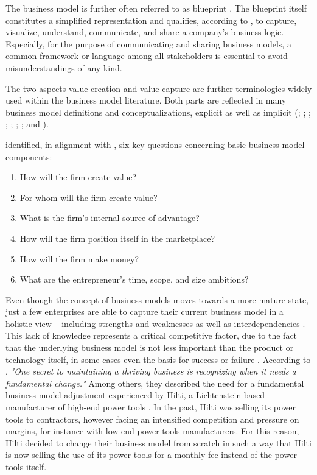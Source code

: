 The business model is further often referred to as blueprint . The blueprint itself constitutes a simplified representation and qualifies, according to \citet[pp. 11-14]{Osterwalder2005}, to capture, visualize, understand, communicate, and share a company's business logic. Especially, for the purpose of communicating and sharing business models, a common framework or language among all stakeholders is essential to avoid misunderstandings of any kind.

The two aspects value creation and value capture are further terminologies widely used within the business model literature. Both parts are reflected in many business model definitions and conceptualizations, explicit as well as implicit (\citealp[p. 511]{Amit2001}; \citealp[pp. 533-534]{Chesbrough2002}; \citealp[p. 727]{Morris2005}; \citealp[p. 202]{Shafer2005}; \citealp[p. 12]{Chesbrough2007}; \citealp[p. 52]{Johnson2008}; \citealp[p. 14]{Osterwalder2010}; and \citealp[pp. 1019-1020]{Zott2011}). 

\citet[pp. 729-732]{Morris2005} identified, in alignment with \citet[pp. 49-61]{Drucker1954}, six key questions concerning basic business model components:

\begin{enumerate}[parsep=0pt, topsep=0pt, itemsep=0pt]
	\item How will the firm create value?
	\item For whom will the firm create value?
	\item What is the firm's internal source of advantage?
	\item How will the firm position itself in the marketplace?
	\item How will the firm make money?
	\item What are the entrepreneur's time, scope, and size ambitions?
\end{enumerate}

Even though the concept of business models moves towards a more mature state, just a few enterprises are able to capture their current business model in a holistic view -- including strengths and weaknesses as well as interdependencies \citep[p. 52]{Johnson2008}. This lack of knowledge represents a critical competitive factor, due to the fact that the underlying business model is not less important than the product or technology itself, in some cases even the basis for success or failure . According to \citet[p. 50]{Johnson2008}, \textit{"One secret to maintaining a thriving business is recognizing when it needs a fundamental change."} Among others, they described the need for a fundamental business model adjustment experienced by Hilti, a Lichtenstein-based manufacturer of high-end power tools \citep[pp. 54-57]{Johnson2008}. In the past, Hilti was selling its power tools to contractors, however facing an intensified competition and pressure on margins, for instance with low-end power tools manufacturers. For this reason, Hilti decided to change their business model from scratch in such a way that Hilti is now selling the use of its power tools for a monthly fee instead of the power tools itself.

